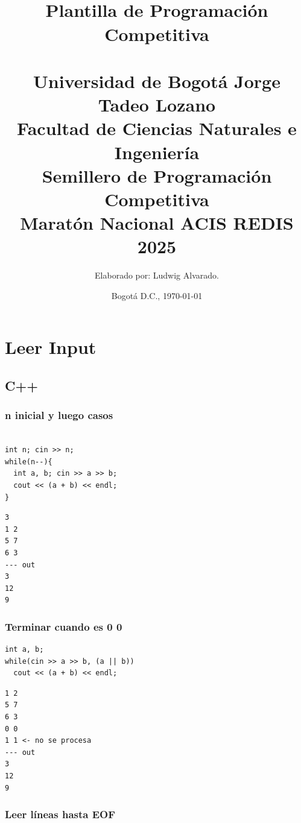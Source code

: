 \documentclass{article}
\title{
    \vspace{2cm}
    \HRule{1pt} \\[0.5cm]
    \textbf{\Huge Plantilla de Programación Competitiva}\\[0.3cm]
    \HRule{1pt} \\[1.5cm]
    \LARGE Universidad de Bogotá Jorge Tadeo Lozano \\[0.3cm]
    \Large Facultad de Ciencias Naturales e Ingeniería\\[0.3cm]
    \Large Semillero de Programación Competitiva\\[1.5cm]
    \large \textbf{Maratón Nacional ACIS REDIS 2025}\\[2cm]
}
\author{
    \Large Elaborado por: Ludwig Alvarado.
}
\date{\vspace{1cm} \Large Bogotá D.C., \today}
\begin{document}
\maketitle
\newpage

\tableofcontents

\thispagestyle{empty}
\newpage
\setcounter{page}{1}




\section{Leer Input}

\subsection{C++}

\subsubsection{n inicial y luego casos}

\begin{lstlisting}[style=cppstyle]

int n; cin >> n;
while(n--){
  int a, b; cin >> a >> b;
  cout << (a + b) << endl;
}

\end{lstlisting}



\begin{lstlisting}
3
1 2
5 7
6 3
--- out
3
12
9
\end{lstlisting}


\subsubsection{Terminar cuando es 0 0}

\begin{lstlisting}[style=cppstyle]
int a, b;
while(cin >> a >> b, (a || b))
  cout << (a + b) << endl;

\end{lstlisting}

\begin{lstlisting}
1 2
5 7
6 3
0 0
1 1 <- no se procesa
--- out
3
12
9
\end{lstlisting}

\subsubsection{Leer líneas hasta EOF}
\end{document}
